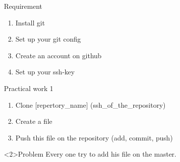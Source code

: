 % 
\begin{frame}{Requirement}
    \begin{enumerate}
        \item Install git
        \item Set up your git config
        \item Create an account on github
        \item Set up your ssh-key
    \end{enumerate}
\end{frame}

\begin{frame}{Practical work 1}
    \begin{enumerate}
        \item Clone [repertory\_name] (ssh\_of\_the\_repository)
        \item Create a file
        \item Push this file on the repository (add, commit, push)
    \end{enumerate}
    \begin{alertblock}<2>{Problem}
        Every one try to add his file on the master.
    \end{alertblock}
\end{frame}


